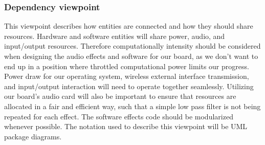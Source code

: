     
            

            
            

    
    \subsubsection{Dependency viewpoint}
        This viewpoint describes how entities are connected and how they should share resources.
        Hardware and software entities will share power, audio, and input/output resources. Therefore computationally intensity should be considered when designing the audio effects and software for our board, as we don't want to end up in a position where throttled computational power limits our progress. Power draw for our operating system, wireless external interface transmission, and input/output interaction will need to operate together seamlessly. Utilizing our board's audio card will also be important to ensure that resources are allocated in a fair and efficient way, such that a simple low pass filter is not being repeated for each effect. The software effects code should be modularized whenever possible. 
        The notation used to describe this viewpoint will be UML package diagrams.

